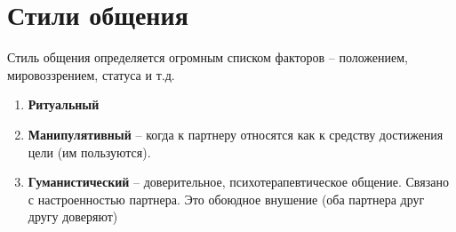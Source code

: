 \section{Стили общения}

Стиль общения определяется огромным списком факторов --
положением, мировоззрением, статуса и т.д.

\begin{enumerate}
    \item \textbf{Ритуальный}
    \item \textbf{Манипулятивный} -- когда к партнеру относятся
        как к средству достижения цели (им пользуются).
    \item \textbf{Гуманистический} -- доверительное,
        психотерапевтическое общение. Связано с
        настроенностью партнера. Это обоюдное внушение
        (оба партнера друг другу доверяют)
\end{enumerate}

